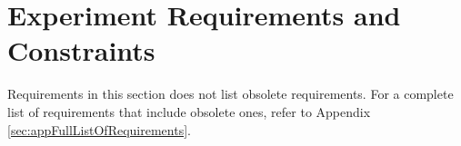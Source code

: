 \pagebreak
\section{Experiment Requirements and Constraints}
Requirements in this section does not list obsolete requirements. For a complete list of requirements that include obsolete ones, refer to Appendix \ref{sec:appFullListOfRequirements}.


\pagebreak

\pagebreak

\pagebreak

\pagebreak


